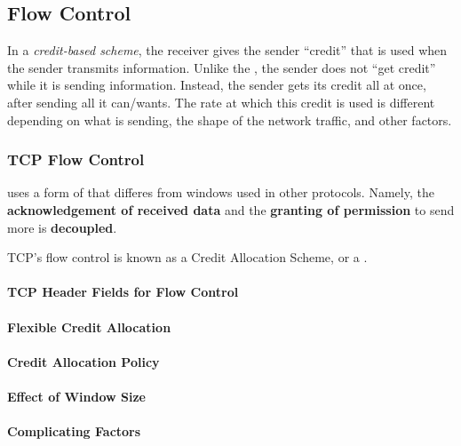 \subsection{Flow Control}\label{subsec:Flow_Control}

\begin{definition}\label{def:Credit_Based_Scheme}
  In a \emph{credit-based scheme}, the receiver gives the sender ``credit'' that is used when the sender transmits information.
  Unlike the , the sender does not ``get credit'' while it is sending information.
  Instead, the sender gets its credit all at once, after sending all it can/wants.
  The rate at which this credit is used is different depending on what is sending, the shape of the network traffic, and other factors.
\end{definition}

\subsubsection{TCP Flow Control}\label{subsubsec:TCP_Flow_Control}
 uses a form of  that differes from windows used in other protocols.
Namely, the \textbf{acknowledgement of received data} and the \textbf{granting of permission} to send more is \textbf{decoupled}.

TCP's flow control is known as a Credit Allocation Scheme, or a .

\paragraph{TCP Header Fields for Flow Control}\label{par:TCP_Header_Fields_Flow_Control}
\paragraph{Flexible Credit Allocation}\label{par:TCP_Flexible_Credit_Allocation}
\paragraph{Credit Allocation Policy}\label{par:TCP_Credit_Allocation_Policy}
\paragraph{Effect of Window Size}\label{par:TCP_Window_Size_Effect}
\paragraph{Complicating Factors}\label{par:TCP_Complicating_Factors}
